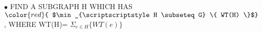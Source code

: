 \documentclass[preview]{standalone}
\begin{document}
\begin{center}
$\bullet$ FIND   A   SUBGRAPH   H  WHICH   HAS {$\color{red}{ $\min_{\scriptscriptstyle H \subseteq G} \{ WT(H) \}$}$} ,  WHERE   WT(H)= $\Sigma_{e \in H} \{ WT(e) \}$
\end{center}
\end{document}
